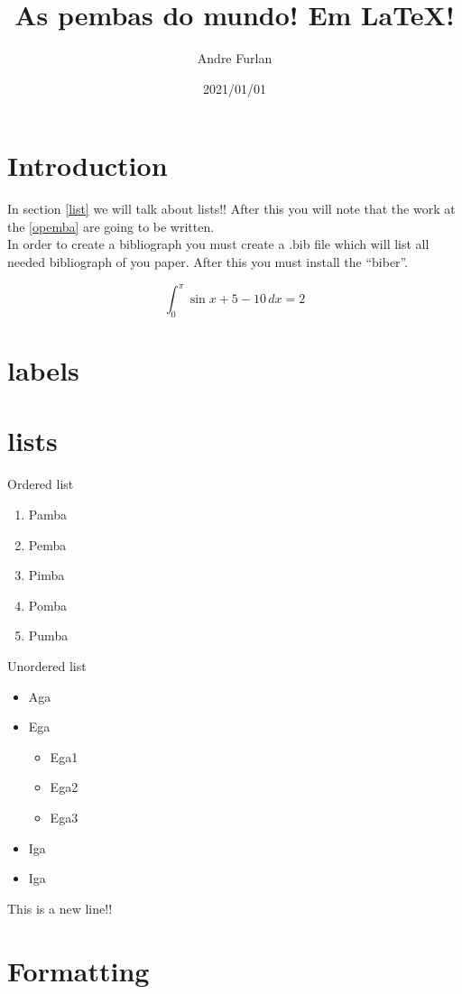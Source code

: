 \documentclass{article}
\author{Andre Furlan}
\title{As pembas do mundo! Em {\LaTeX}!}
\date{2021/01/01}
\begin{document}
\maketitle

\section{Introduction}
In section \ref{list} we will talk about lists!!
After this you will note that the work at the \ref{opemba} are going to be written.\\

In order to create a bibliograph you must create a .bib file which will list all needed bibliograph of you paper. After this you must install the ``biber''.

\begin{equation}\label{equation1}
\int_{0}^{\pi} \sin x+5-10 \, dx = 2 
\end{equation}


\section{labels}

\section{lists\label{list}}

Ordered list
\begin{enumerate}
	\item Pamba
	\item Pemba\label{opemba}
	\item Pimba
	\item Pomba
	\item Pumba
\end{enumerate}

Unordered list
\begin{itemize}
	\item Aga
	\item Ega
		\begin{itemize}
			\item Ega1
			\item Ega2
			\item Ega3
		\end{itemize}
	\item Iga
	\item Iga
\end{itemize}

This is a new line!!
\section{Formatting}
\end{document}
